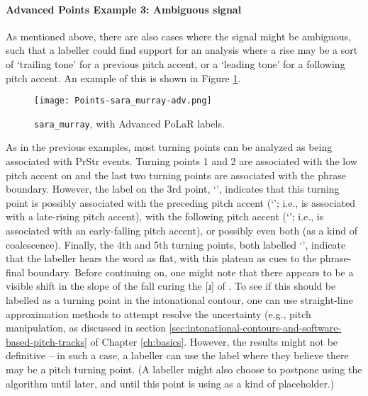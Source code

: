 \paragraph{Advanced Points Example 3: Ambiguous signal}
As mentioned above, there are also cases where the signal might be ambiguous, such that a labeller could find support for an analysis where a rise may be a sort of ‘trailing tone’ for a previous pitch accent, or a ‘leading tone’ for a following pitch accent. An example of this is shown in Figure \ref{fig:sara_murray Points Adv}.

\begin{figure}[H]
\centering
%
\texttt{[image: Points-sara\_murray-adv.png]}
%
\caption{\texttt{sara\_murray}, with Advanced PoLaR labels.%
\label{fig:sara_murray Points Adv}%
}
\end{figure}

As in the previous examples, most turning points can be analyzed as being associated with PrStr events. Turning points 1 and 2 are associated with the low pitch accent on  and the last two turning points are associated with the phrase boundary. However, the label on the 3rd point, ‘\textlabel{*</*>}’, indicates that this turning point is possibly associated with the preceding pitch accent (‘\textlabel{*<}’; i.e.,  is associated with a late-rising pitch accent), with the following pitch accent (‘\textlabel{*>}’; i.e.,  is associated with an early-falling pitch accent), or possibly even both (as a kind of coalescence). Finally, the 4th and 5th turning points, both labelled ‘\textlabel{]>}’, indicate that the labeller hears the word  as flat, with this plateau as cues to the phrase-final boundary. Before continuing on, one might note that there appears to be a visible shift in the slope of the fall curing the [ɹ] of . To see if this should be labelled as a turning point in the intonational contour, one can use straight-line approximation methods to attempt resolve the uncertainty (e.g., pitch manipulation, as discussed in section \ref{sec:intonational-contours-and-software-based-pitch-tracks} of Chapter \ref{ch:basics}. However, the results might not be definitive – in such a case, a labeller can use the  label where they believe there may be a pitch turning point. (A labeller might also choose to postpone using the algorithm until later, and until this point is using  as a kind of placeholder.)

